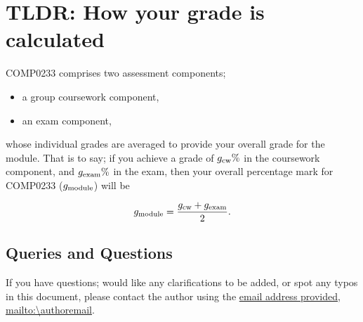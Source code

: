\section{TLDR: How your grade is calculated} \label{sec:tldr}

COMP0233 comprises two assessment components;

\begin{itemize}
  \item a group coursework component,
  \item an exam component,
\end{itemize}

whose individual grades are averaged to provide your overall grade for the module.
That is to say; if you achieve a grade of $g_{\mathrm{cw}} \%$ in the coursework component, and $g_{\mathrm{exam}} \%$ in the exam, then your overall percentage mark for COMP0233 ($g_{\mathrm{module}}$) will be

\begin{align*}
  g_{\mathrm{module}} = \frac{g_{\mathrm{cw}} + g_{\mathrm{exam}}}{2}.
\end{align*}

\subsection*{Queries and Questions}

If you have questions; would like any clarifications to be added, or spot any typos in this document, please contact the author using the \href{mailto:\authoremail}{email address provided}, \url{mailto:\authoremail}.
